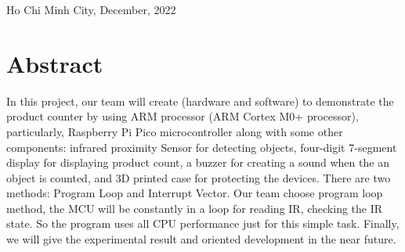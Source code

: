 \documentclass[13pt,a4paper,twoside]{report}
\begin{document}
\begin{titlepage}
\begin{otherlanguage}{vietnamese}
\end{otherlanguage}

\vspace{2cm}
\begin{center}
{\fontsize{13pt}{1}\selectfont Ho Chi Minh City,  December, 2022}
\end{center}
\end{titlepage}

\tableofcontents

\chapter{Abstract}
In this project, our team will create (hardware and software) to demonstrate the product counter by using ARM processor (ARM Cortex M0+ processor), particularly, Raspberry Pi Pico microcontroller along with some other components: infrared proximity Sensor for detecting objects, four-digit 7-segment display for displaying product count, a buzzer for creating a sound when the an object is counted, and 3D printed case for protecting the devices. There are two methods: Program Loop and Interrupt Vector. Our team choose program loop method, the MCU will be constantly in a loop for reading IR, checking the IR state. So the program uses all CPU performance just for this simple task. Finally, we will give the experimental result and oriented development in the near future.
\end{document}
